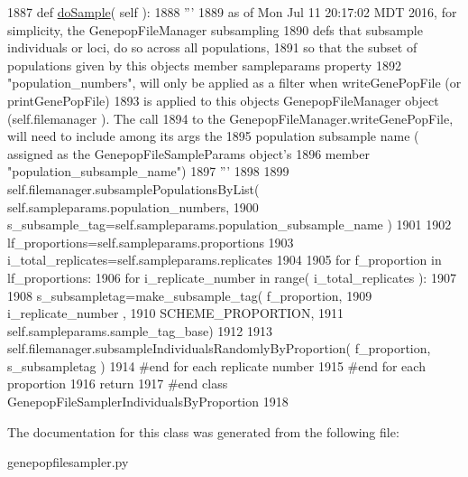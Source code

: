 \begin{DoxyCode}
1887     \textcolor{keyword}{def }\hyperlink{classnegui_1_1genepopfilesampler_1_1GenepopFileSamplerIndividualsByProportion_ad8170ea6661afa7bff72d484372209e3}{doSample}( self ):
1888         \textcolor{stringliteral}{'''}
1889 \textcolor{stringliteral}{        as of Mon Jul 11 20:17:02 MDT 2016, for simplicity, the GenepopFileManager subsampling}
1890 \textcolor{stringliteral}{        defs that subsample individuals or loci, do so across all populations,}
1891 \textcolor{stringliteral}{        so that the subset of populations given by this objects member sampleparams property }
1892 \textcolor{stringliteral}{        "population\_numbers", will only be applied as a filter when writeGenePopFile (or printGenePopFile)}
1893 \textcolor{stringliteral}{        is applied to this objects GenepopFileManager object (self.filemanager ). The call}
1894 \textcolor{stringliteral}{        to the GenepopFileManager.writeGenePopFile, will need to include among its args the }
1895 \textcolor{stringliteral}{        population subsample name ( assigned as the GenepopFileSampleParams object's}
1896 \textcolor{stringliteral}{        member "population\_subsample\_name") }
1897 \textcolor{stringliteral}{        '''}
1898 
1899         self.filemanager.subsamplePopulationsByList( self.sampleparams.population\_numbers, 
1900                 s\_subsample\_tag=self.sampleparams.population\_subsample\_name )
1901 
1902         lf\_proportions=self.sampleparams.proportions
1903         i\_total\_replicates=self.sampleparams.replicates
1904 
1905         \textcolor{keywordflow}{for} f\_proportion \textcolor{keywordflow}{in} lf\_proportions:
1906             \textcolor{keywordflow}{for} i\_replicate\_number \textcolor{keywordflow}{in} range( i\_total\_replicates ):
1907 
1908                 s\_subsampletag=make\_subsample\_tag(  f\_proportion, 
1909                                                     i\_replicate\_number , 
1910                                                     SCHEME\_PROPORTION,
1911                                                     self.sampleparams.sample\_tag\_base)
1912 
1913                 self.filemanager.subsampleIndividualsRandomlyByProportion( f\_proportion, s\_subsampletag ) 
1914             \textcolor{comment}{#end for each replicate number  }
1915         \textcolor{comment}{#end for each proportion}
1916         \textcolor{keywordflow}{return}
1917 \textcolor{comment}{#end class GenepopFileSamplerIndividualsByProportion}
1918 
\end{DoxyCode}


The documentation for this class was generated from the following file\+:\begin{DoxyCompactItemize}
\item 
genepopfilesampler.\+py\end{DoxyCompactItemize}
